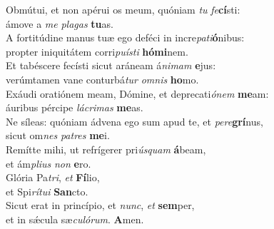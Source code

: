 \oddverse Obmútui, et non apérui os meum, quóniam \textit{tu} \textit{fe}\textbf{cí}sti:~\*\\
\oddverse ámove a \textit{me} \textit{pla}\textit{gas} \textbf{tu}as.\\
\evenverse A fortitúdine manus tuæ ego deféci in incre\textit{pa}\textit{ti}\textbf{ó}nibus:~\*\\
\evenverse propter iniquitátem corri\textit{pu}\textit{í}\textit{sti} \textbf{hó}\textbf{mi}nem.\\
\oddverse Et tabéscere fecísti sicut aráneam á\textit{ni}\textit{mam} \textbf{e}jus:~\*\\
\oddverse verúmtamen vane conturbá\textit{tur} \textit{om}\textit{nis} \textbf{ho}mo.\\
\evenverse Exáudi oratiónem meam, Dómine, et deprecati\textit{ó}\textit{nem} \textbf{me}am:~\*\\
\evenverse áuribus pércipe \textit{lá}\textit{cri}\textit{mas} \textbf{me}as.\\
\oddverse Ne síleas: quóniam ádvena ego sum apud te, et \textit{pe}\textit{re}\textbf{grí}nus,~\*\\
\oddverse sicut om\textit{nes} \textit{pa}\textit{tres} \textbf{me}i.\\
\evenverse Remítte mihi, ut refrígerer pri\textit{ús}\textit{quam} \textbf{á}beam,~\*\\
\evenverse et ám\textit{pli}\textit{us} \textit{non} \textbf{e}ro.\\
\oddverse Glória Pa\textit{tri}, \textit{et} \textbf{Fí}lio,~\*\\
\oddverse et Spi\textit{rí}\textit{tu}\textit{i} \textbf{San}cto.\\
\evenverse Sicut erat in princípio, et \textit{nunc}, \textit{et} \textbf{sem}per,~\*\\
\evenverse et in sǽcula sæ\textit{cu}\textit{ló}\textit{rum}. \textbf{A}men.\\
